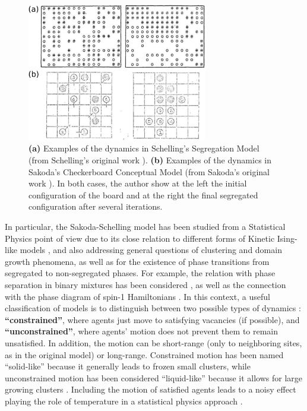 \begin{figure}
    \centering
    \captionsetup{font=sf}
    \includegraphics[width=0.7\textwidth]{Figs/Introduction/schelling_diagrams.pdf}
    \caption[Schelling and Sakoda checkerboard examples]{\textbf{(a)} Examples of the dynamics in Schelling's Segregation Model (from Schelling's original work \cite{Schelling}). \textbf{(b)} Examples of the dynamics in Sakoda’s Checkerboard Conceptual Model (from Sakoda's original work \cite{sakoda1949minidoka}). In both cases, the author show at the left the initial configuration of the board and at the right the final segregated configuration after several iterations.}
    \label{fig:Schelling_fig}
\end{figure}

In particular, the Sakoda-Schelling model has been studied from a Statistical Physics point of view due to its close relation to different forms of Kinetic Ising-like models \cite{stauffer-2007,stauffer-2013}, and also addressing general questions of clustering and domain growth phenomena, as well as for the existence of phase transitions from segregated to non-segregated phases. For example, the relation with phase separation in binary mixtures has been considered \cite{Dall_Asta_2008,Vinkovic}, as well as the connection with the phase diagram of spin-1 Hamiltonians \cite{BEG,BlumeCapel,Gauvin_2009,Gauvin_2010}. In this context, a useful classification of models is to distinguish between two possible types of dynamics \cite{Dall_Asta_2008}: \textbf{``constrained''}, where agents just move to satisfying vacancies (if possible), and \textbf{``unconstrained''},  where agents' motion does not prevent them to remain unsatisfied. In addition, the motion can be short-range (only to neighboring sites, as in the original model) or long-range. Constrained motion has been named ``solid-like'' because it generally leads to frozen small clusters, while unconstrained motion has been considered ``liquid-like'' because it allows for large growing clusters \cite{Vinkovic}. Including the motion of satisfied agents leads to a noisy effect playing the role of temperature in a statistical physics approach \cite{Gauvin_2009,Gauvin_2010}.


